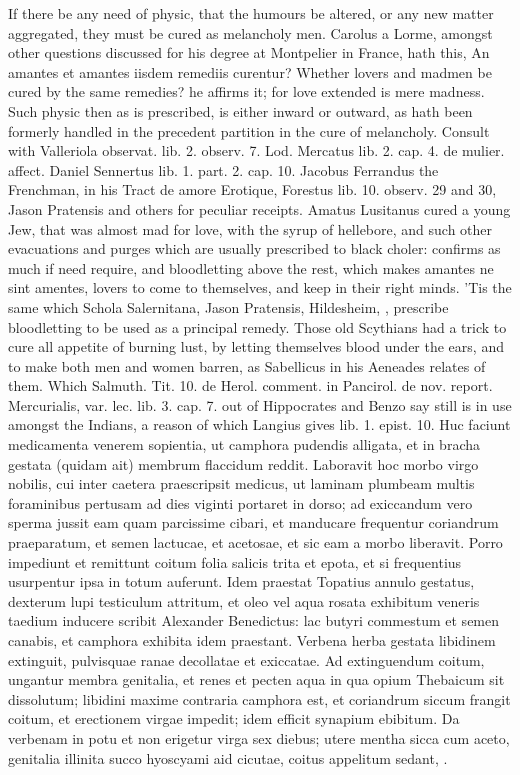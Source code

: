 If there be any need of physic, that the humours be altered, or any new
matter aggregated, they must be cured as melancholy men. Carolus a
Lorme, amongst other questions discussed for his degree at Montpelier
in France, hath this, An amantes et amantes iisdem remediis curentur?
Whether lovers and madmen be cured by the same remedies? he affirms it;
for love extended is mere madness. Such physic then as is prescribed,
is either inward or outward, as hath been formerly handled in the
precedent partition in the cure of melancholy. Consult with Valleriola
observat. lib. 2. observ. 7. Lod. Mercatus lib. 2. cap. 4. de mulier.
affect. Daniel Sennertus lib. 1. part. 2. cap. 10. Jacobus
Ferrandus the Frenchman, in his \textlatin{Tract de amore Erotique}, Forestus lib.
10. observ. 29 and 30, Jason Pratensis and others for peculiar
receipts. Amatus Lusitanus cured a young Jew, that was almost mad
for love, with the syrup of hellebore, and such other evacuations and
purges which are usually prescribed to black choler: \Avicenna{}
confirms as much if need require, and bloodletting above the
rest, which makes amantes ne sint amentes, lovers to come to
themselves, and keep in their right minds. 'Tis the same which Schola
Salernitana, Jason Pratensis, Hildesheim, \etc{}, prescribe bloodletting
to be used as a principal remedy. Those old Scythians had a trick to
cure all appetite of burning lust, by  letting themselves blood
under the ears, and to make both men and women barren, as Sabellicus in
his Aeneades relates of them. Which Salmuth. Tit. 10. de Herol.
comment. in Pancirol. de nov. report. Mercurialis, var. lec. lib. 3.
cap. 7. out of Hippocrates and Benzo say still is in use amongst the
Indians, a reason of which Langius gives lib. 1. epist. 10.
Huc faciunt medicamenta venerem sopientia, ut camphora pudendis
alligata, et in bracha gestata (quidam ait) membrum flaccidum reddit.
Laboravit hoc morbo virgo nobilis, cui inter caetera praescripsit
medicus, ut laminam plumbeam multis foraminibus pertusam ad dies
viginti portaret in dorso; ad exiccandum vero sperma jussit eam quam
parcissime cibari, et manducare frequentur coriandrum praeparatum, et
semen lactucae, et acetosae, et sic eam a morbo liberavit. Porro
impediunt et remittunt coitum folia salicis trita et epota, et si
frequentius usurpentur ipsa in totum auferunt. Idem praestat Topatius
annulo gestatus, dexterum lupi testiculum attritum, et oleo vel aqua
rosata exhibitum veneris taedium inducere scribit Alexander Benedictus:
lac butyri commestum et semen canabis, et camphora exhibita idem
praestant. Verbena herba gestata libidinem extinguit, pulvisquae ranae
decollatae et exiccatae. Ad extinguendum coitum, ungantur membra
genitalia, et renes et pecten aqua in qua opium Thebaicum sit
dissolutum; libidini maxime contraria camphora est, et coriandrum
siccum frangit coitum, et erectionem virgae impedit; idem efficit
synapium ebibitum. Da verbenam in potu et non erigetur virga sex
diebus; utere mentha sicca cum aceto, genitalia illinita succo
hyoscyami aid cicutae, coitus appelitum sedant, \etc{}.

